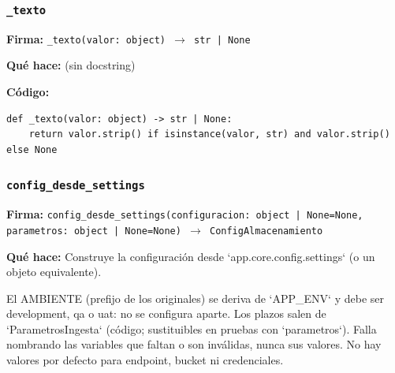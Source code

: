 \documentclass[11pt,a4paper]{article}
\begin{document}
\subsubsection*{\texttt{\_texto}}
\textbf{Firma:} \texttt{\_texto(valor: object) $\rightarrow$ str | None}

\textbf{Qué hace:} (sin docstring)

\textbf{Código:}
\begin{lstlisting}
def _texto(valor: object) -> str | None:
    return valor.strip() if isinstance(valor, str) and valor.strip() else None
\end{lstlisting}

\subsubsection*{\texttt{config\_desde\_settings}}
\textbf{Firma:} \texttt{config\_desde\_settings(configuracion: object | None=None, parametros: object | None=None) $\rightarrow$ ConfigAlmacenamiento}

\textbf{Qué hace:} Construye la configuración desde `app.core.config.settings` (o un objeto equivalente).

El AMBIENTE (prefijo de los originales) se deriva de `APP\_ENV` y debe ser development, qa o uat: no se
configura aparte. Los plazos salen de `ParametrosIngesta` (código; sustituibles en pruebas con `parametros`).
Falla nombrando las variables que faltan o son inválidas, nunca sus valores. No hay valores por defecto para
endpoint, bucket ni credenciales.
\end{document}
